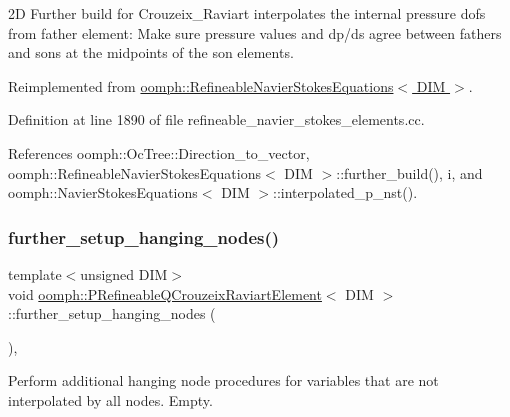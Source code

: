 2D Further build for Crouzeix\+\_\+\+Raviart interpolates the internal pressure dofs from father element\+: Make sure pressure values and dp/ds agree between fathers and sons at the midpoints of the son elements. 

Reimplemented from \hyperlink{classoomph_1_1RefineableNavierStokesEquations_a7afd6250585ea597c3df65b8c7744da4}{oomph\+::\+Refineable\+Navier\+Stokes\+Equations$<$ D\+I\+M $>$}.



Definition at line 1890 of file refineable\+\_\+navier\+\_\+stokes\+\_\+elements.\+cc.



References oomph\+::\+Oc\+Tree\+::\+Direction\+\_\+to\+\_\+vector, oomph\+::\+Refineable\+Navier\+Stokes\+Equations$<$ D\+I\+M $>$\+::further\+\_\+build(), i, and oomph\+::\+Navier\+Stokes\+Equations$<$ D\+I\+M $>$\+::interpolated\+\_\+p\+\_\+nst().

\mbox{\label{classoomph_1_1PRefineableQCrouzeixRaviartElement_a782e45a47d5e1df77bcbc6480f90c24d}} 
\subsubsection{\texorpdfstring{further\+\_\+setup\+\_\+hanging\+\_\+nodes()}{further\_setup\_hanging\_nodes()}}
{\footnotesize\ttfamily template$<$unsigned D\+IM$>$ \\
void \hyperlink{classoomph_1_1PRefineableQCrouzeixRaviartElement}{oomph\+::\+P\+Refineable\+Q\+Crouzeix\+Raviart\+Element}$<$ D\+IM $>$\+::further\+\_\+setup\+\_\+hanging\+\_\+nodes (\begin{DoxyParamCaption}{ }\end{DoxyParamCaption})\hspace{0.3cm}{\ttfamily [inline]}, {\ttfamily [virtual]}}



Perform additional hanging node procedures for variables that are not interpolated by all nodes. Empty. 



